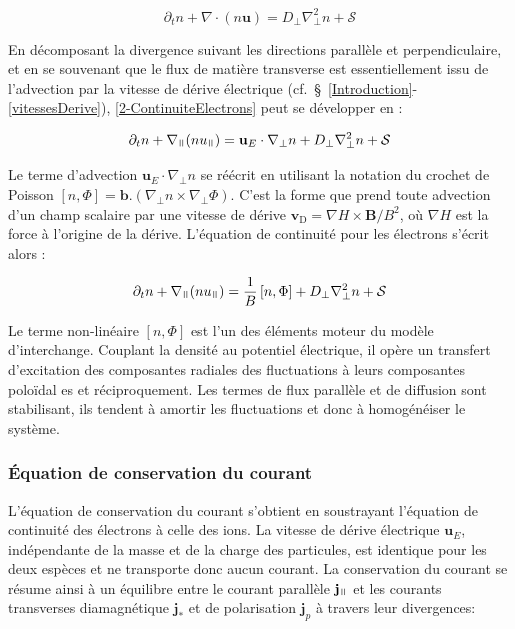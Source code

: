 \begin{refsection}
\begin{equation}
\label{2-ContinuiteElectrons}
\partial_t n + \nabla\cdot(n\mathbf{u}) = D_\perp\nabla^2_\perp n + \mathcal{S}
\end{equation}

En décomposant la divergence suivant les directions parallèle et
perpendiculaire, et en se souvenant que le flux de matière transverse est
essentiellement issu de l'advection par la vitesse de dérive électrique
(cf.~\S~\ref{Introduction}-\ref{vitessesDerive}), \eqref{2-ContinuiteElectrons}
peut se développer en :

\begin{equation}
\label{2-ContinuiteElectrons2}
\partial_t n + \nabla_\para(nu_{\para}) =
\mathbf{u}_E\cdot\nabla_\perp n + D_\perp\nabla^2_\perp n + \mathcal{S}
\end{equation}

Le terme d'advection $\mathbf{u}_E\cdot\nabla_\perp
n$ se réécrit en utilisant la notation
du crochet de Poisson $[n,\Phi]=\mathbf{b}.(\nabla_\perp
n\times\nabla_\perp\Phi)$.
C'est la forme que prend toute advection d'un champ scalaire par une vitesse de
dérive $\mathbf{v}_\text{D}=\nabla H\times\mathbf{B}/B^2$, où $\nabla H$ est la
force à l'origine de la dérive. L'équation de continuité pour les électrons
s'écrit alors :

\begin{equation}
\label{2-eqContinuiteFinale}
\partial_t n + \nabla_{\para}(nu_{\para}) =
\frac{1}{B}\left[n,\Phi\right] + D_\perp\nabla^2_\perp n + \mathcal{S}
\end{equation}

Le terme non-linéaire $[n,\Phi]$ est l'un des éléments moteur du modèle
d'interchange. Couplant la densité au potentiel électrique, il opère un
transfert d'excitation des composantes radiales des fluctuations à leurs
composantes poloïdal es et réciproquement. Les termes de flux parallèle et de
diffusion sont stabilisant, ils tendent à
amortir les fluctuations et donc à homogénéiser le système.

\subsubsection{Équation de conservation du courant}
L'équation de conservation du courant s'obtient en soustrayant l'équation de
continuité des électrons à celle des ions. La vitesse de dérive électrique
$\mathbf{u}_E$, indépendante de la masse et de la charge des particules,
est identique pour les deux espèces et ne transporte donc aucun courant. 
La conservation du courant se résume ainsi à un équilibre entre le courant
parallèle $\mathbf{j}_\para$ et les courants transverses diamagnétique
$\mathbf{j}_*$ et de polarisation $\mathbf{j}_p$ à travers leur
divergences:


\end{refsection}
